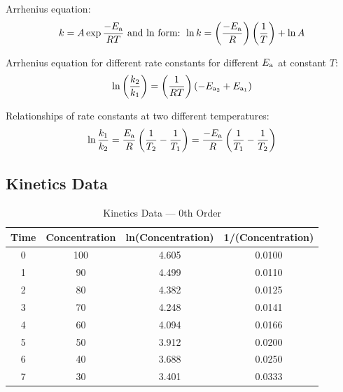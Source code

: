 \documentclass[10pt]{article}
\begin{document}
Arrhenius equation:
\begin{equation*}
k = A \exp{\frac{-E_\textnormal{a}}{RT}} \textnormal{ and ln form: } \ln k = \left(\frac{-E_\textnormal{a}}{R}\right)\left(\frac{1}{T}\right) + \ln A
\end{equation*}

Arrhenius equation for different rate constants for different $E_{\textnormal{a}}$ at constant $T$:
\begin{equation*}
\ln{\left(\frac{k_2}{k_1}\right)} = \left(\frac{1}{RT}\right)(-E_{\textnormal{a}_2}+E_{\textnormal{a}_1})
\end{equation*}

Relationships of rate constants at two different temperatures:
\begin{equation*}
\ln \frac{k_1}{k_2} = \frac{E_\textnormal{a}}{R}\left(\frac{1}{T_2} - \frac{1}{T_1}\right) = \frac{-E_\textnormal{a}}{R}\left(\frac{1}{T_1}-\frac{1}{T_2}\right)
\end{equation*}

\newpage
\subsection{Kinetics Data}

\begin{table}[H]
    \centering
    \caption{Kinetics Data --- 0th Order}
        \begin{tabular}{cccc}
            \toprule
                Time & Concentration & ln(Concentration) & 1/(Concentration) \\
                \midrule
                0     & 100   & 4.605 & 0.0100 \\
                1     & 90    & 4.499 & 0.0110 \\
                2     & 80    & 4.382 & 0.0125 \\
                3     & 70    & 4.248 & 0.0141 \\
                4     & 60    & 4.094 & 0.0166 \\
                5     & 50    & 3.912 & 0.0200 \\
                6     & 40    & 3.688 & 0.0250 \\
                7     & 30    & 3.401 & 0.0333 \\
            \bottomrule
        \end{tabular}
\end{table}
\vspace*{-.7cm}    
{\centering\\[-3.7ex]
\\[-3.6ex]
\\}
\end{document}

